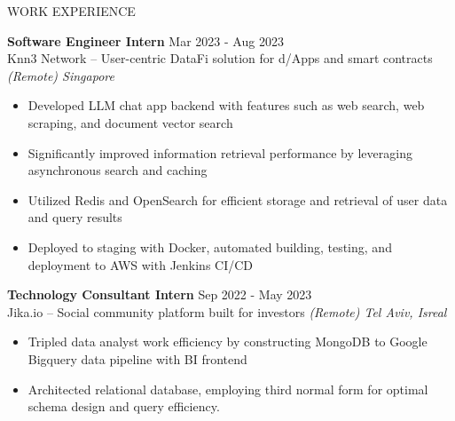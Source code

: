 \documentclass{resume} %
\begin{document}
\begin{rSection}{WORK EXPERIENCE}

	\textbf{Software Engineer Intern} \hfill Mar 2023 - Aug 2023\\
	Knn3 Network – User-centric DataFi solution for d/Apps and smart contracts  \hfill \textit{(Remote) Singapore}
	\begin{itemize}
		\item Developed LLM chat app backend with features such as web search, web scraping, and document vector search
		\item Significantly improved information retrieval performance by leveraging asynchronous search and caching
		\item Utilized Redis and OpenSearch for efficient storage and retrieval of user data and query results
		\item Deployed to staging with Docker, automated building, testing, and deployment to AWS with Jenkins CI/CD
	\end{itemize}

	\textbf{Technology Consultant Intern} \hfill Sep 2022 - May 2023\\
	Jika.io – Social community platform built for investors \hfill \textit{(Remote) Tel Aviv, Isreal}
	\begin{itemize}
		\item Tripled data analyst work efficiency by constructing MongoDB to Google Bigquery data pipeline with BI frontend
		\item Architected relational database, employing third normal form for optimal schema design and query efficiency.
	\end{itemize}

\end{rSection}

\end{document}
